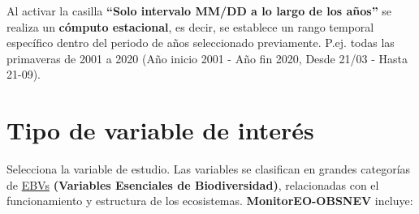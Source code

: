 \documentclass[
]{book}
\begin{document}
Al activar la casilla \textbf{``Solo intervalo MM/DD a lo largo de los años''} se realiza un \textbf{cómputo estacional}, es decir, se establece un rango temporal específico dentro del periodo de años seleccionado previamente. P.ej. todas las primaveras de 2001 a 2020 (Año inicio 2001 - Año fin 2020, Desde 21/03 - Hasta 21-09).

\chapter{Tipo de variable de interés}\label{tipo-variable}

Selecciona la variable de estudio. Las variables se clasifican en grandes categorías de \href{https://geobon.org/ebvs/what-are-ebvs/}{EBVs} \textbf{(Variables Esenciales de Biodiversidad)}, relacionadas con el funcionamiento y estructura de los ecosistemas. \textbf{MonitorEO-OBSNEV} incluye:
\end{document}
